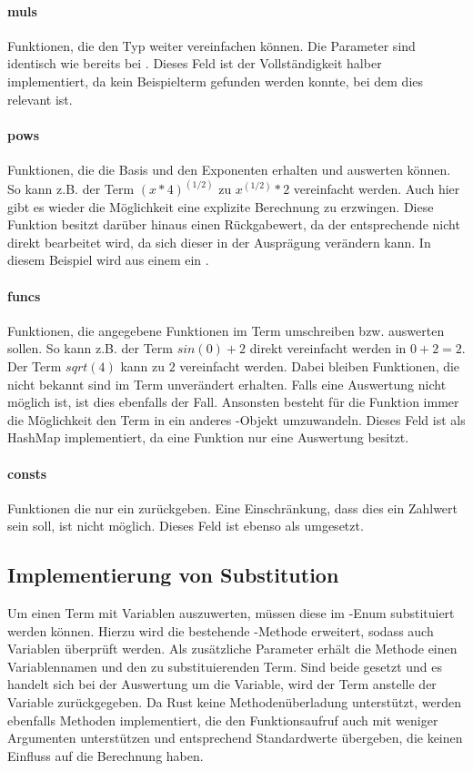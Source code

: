 \documentclass[11pt,a4paper, ngerman]{article}
\begin{document}
\paragraph{muls} Funktionen, die den Typ  weiter vereinfachen können. Die Parameter sind identisch wie bereits bei . Dieses Feld ist der Vollständigkeit halber implementiert, da kein Beispielterm gefunden werden konnte, bei dem dies relevant ist.

\paragraph{pows} Funktionen, die die Basis und den Exponenten erhalten und auswerten können. So kann z.B. der Term $(x*4)^{(1/2)}$ zu $x^{(1/2)}*2$ vereinfacht werden. Auch hier gibt es wieder die Möglichkeit eine explizite Berechnung zu erzwingen. Diese Funktion besitzt darüber hinaus einen Rückgabewert, da der entsprechende  nicht direkt bearbeitet wird, da sich dieser in der Ausprägung verändern kann. In diesem Beispiel wird aus einem  ein .

\label{sec:EvalFnFuncs}
\paragraph{funcs} Funktionen, die angegebene Funktionen im Term umschreiben bzw. auswerten sollen. So kann z.B. der Term $sin(0) + 2$ direkt vereinfacht werden in $0 + 2 = 2$. Der Term $sqrt(4)$ kann zu $2$ vereinfacht werden. Dabei bleiben Funktionen, die  nicht bekannt sind im Term unverändert erhalten. Falls eine Auswertung nicht möglich ist, ist dies ebenfalls der Fall. Ansonsten besteht für die Funktion immer die Möglichkeit den Term in ein anderes -Objekt umzuwandeln. Dieses Feld ist als HashMap implementiert, da eine Funktion nur eine Auswertung besitzt.

\paragraph{consts} Funktionen die nur ein  zurückgeben. Eine Einschränkung, dass dies ein Zahlwert sein soll, ist nicht möglich. Dieses Feld ist ebenso als  umgesetzt.

\subsection{Implementierung von Substitution} Um einen Term mit Variablen auszuwerten, müssen diese im -Enum substituiert werden können. Hierzu wird die bestehende -Methode erweitert, sodass auch Variablen überprüft werden. Als zusätzliche Parameter erhält die Methode einen Variablennamen und den zu substituierenden Term. Sind beide gesetzt und es handelt sich bei der Auswertung um die Variable, wird der Term anstelle der Variable zurückgegeben. Da Rust keine Methodenüberladung unterstützt, werden ebenfalls Methoden implementiert, die den Funktionsaufruf auch mit weniger Argumenten unterstützen und entsprechend Standardwerte übergeben, die keinen Einfluss auf die Berechnung haben.
\end{document}
